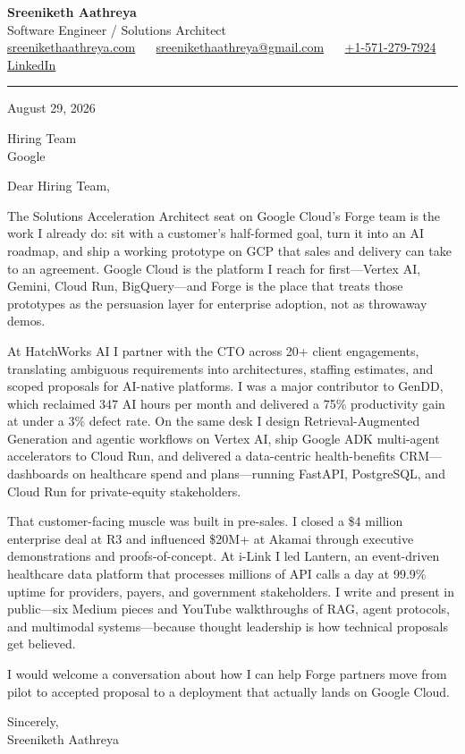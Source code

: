 \documentclass[11pt, letterpaper]{article}
\begin{document}
{\fontsize{18 pt}{20 pt}\selectfont\bfseries Sreeniketh Aathreya}\\[4pt]
Software Engineer / Solutions Architect\\[6pt]
\href{https://sreenikethaathreya.com}{sreenikethaathreya.com}
~\textbullet~
\href{mailto:sreenikethaathreya@gmail.com}{sreenikethaathreya@gmail.com}
~\textbullet~
\href{tel:+1-571-279-7924}{+1-571-279-7924}
~\textbullet~
\href{https://www.linkedin.com/in/sreeniketh-aathreya-16800b122/}{LinkedIn}

\vspace{12pt}
\hrule
\vspace{12pt}

August 29, 2026

\vspace{8pt}

Hiring Team\\
Google

\vspace{12pt}

Dear Hiring Team,

The Solutions Acceleration Architect seat on Google Cloud's Forge team is the work I already do: sit with a customer's half-formed goal, turn it into an AI roadmap, and ship a working prototype on GCP that sales and delivery can take to an agreement. Google Cloud is the platform I reach for first---Vertex AI, Gemini, Cloud Run, BigQuery---and Forge is the place that treats those prototypes as the persuasion layer for enterprise adoption, not as throwaway demos.

At HatchWorks AI I partner with the CTO across 20+ client engagements, translating ambiguous requirements into architectures, staffing estimates, and scoped proposals for AI-native platforms. I was a major contributor to GenDD, which reclaimed 347 AI hours per month and delivered a 75\% productivity gain at under a 3\% defect rate. On the same desk I design Retrieval-Augmented Generation and agentic workflows on Vertex AI, ship Google ADK multi-agent accelerators to Cloud Run, and delivered a data-centric health-benefits CRM---dashboards on healthcare spend and plans---running FastAPI, PostgreSQL, and Cloud Run for private-equity stakeholders.

That customer-facing muscle was built in pre-sales. I closed a \$4 million enterprise deal at R3 and influenced \$20M+ at Akamai through executive demonstrations and proofs-of-concept. At i-Link I led Lantern, an event-driven healthcare data platform that processes millions of API calls a day at 99.9\% uptime for providers, payers, and government stakeholders. I write and present in public---six Medium pieces and YouTube walkthroughs of RAG, agent protocols, and multimodal systems---because thought leadership is how technical proposals get believed.

I would welcome a conversation about how I can help Forge partners move from pilot to accepted proposal to a deployment that actually lands on Google Cloud.

Sincerely,\\[12pt]
Sreeniketh Aathreya
\end{document}
